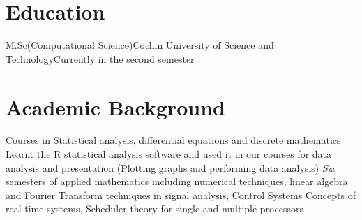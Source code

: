 \documentclass [a4paper,11pt]{moderncv}
\begin{document}
\maketitle
\section{Education}
 {M.Sc(Computational Science)}{Cochin University of Science and Technology}{}{\newline{}Currently in the second semester}{}

\section{Academic Background}
 {Courses in Statistical analysis, differential equations and discrete mathematics}
 {Learnt the R statistical analysis software and used it in our courses for data analysis and presentation (Plotting graphs and performing data analysis)}
 {\emph{Six} semesters of applied mathematics including numerical techniques, linear algebra and Fourier Transform techniques in signal analysis, Control Systems}
 {Concepts of real-time systems, Scheduler theory for single and multiple processors}
\end{document}
